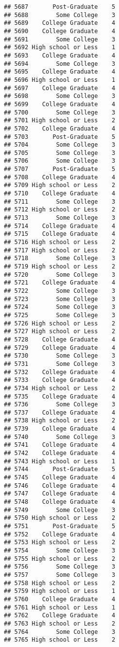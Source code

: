 \documentclass[
]{article}
\begin{document}
\begin{verbatim}
## 5687       Post-Graduate    5
## 5688        Some College    3
## 5689    College Graduate    4
## 5690    College Graduate    4
## 5691        Some College    3
## 5692 High school or Less    1
## 5693    College Graduate    4
## 5694        Some College    3
## 5695    College Graduate    4
## 5696 High school or Less    1
## 5697    College Graduate    4
## 5698        Some College    3
## 5699    College Graduate    4
## 5700        Some College    3
## 5701 High school or Less    2
## 5702    College Graduate    4
## 5703       Post-Graduate    5
## 5704        Some College    3
## 5705        Some College    3
## 5706        Some College    3
## 5707       Post-Graduate    5
## 5708    College Graduate    4
## 5709 High school or Less    2
## 5710    College Graduate    4
## 5711        Some College    3
## 5712 High school or Less    2
## 5713        Some College    3
## 5714    College Graduate    4
## 5715    College Graduate    4
## 5716 High school or Less    2
## 5717 High school or Less    2
## 5718        Some College    3
## 5719 High school or Less    2
## 5720        Some College    3
## 5721    College Graduate    4
## 5722        Some College    3
## 5723        Some College    3
## 5724        Some College    3
## 5725        Some College    3
## 5726 High school or Less    2
## 5727 High school or Less    2
## 5728    College Graduate    4
## 5729    College Graduate    4
## 5730        Some College    3
## 5731        Some College    3
## 5732    College Graduate    4
## 5733    College Graduate    4
## 5734 High school or Less    2
## 5735    College Graduate    4
## 5736        Some College    3
## 5737    College Graduate    4
## 5738 High school or Less    2
## 5739    College Graduate    4
## 5740        Some College    3
## 5741    College Graduate    4
## 5742    College Graduate    4
## 5743 High school or Less    1
## 5744       Post-Graduate    5
## 5745    College Graduate    4
## 5746    College Graduate    4
## 5747    College Graduate    4
## 5748    College Graduate    4
## 5749        Some College    3
## 5750 High school or Less    2
## 5751       Post-Graduate    5
## 5752    College Graduate    4
## 5753 High school or Less    2
## 5754        Some College    3
## 5755 High school or Less    2
## 5756        Some College    3
## 5757        Some College    3
## 5758 High school or Less    2
## 5759 High school or Less    1
## 5760    College Graduate    4
## 5761 High school or Less    1
## 5762    College Graduate    4
## 5763 High school or Less    2
## 5764        Some College    3
## 5765 High school or Less    2

\end{verbatim}
\end{document}
